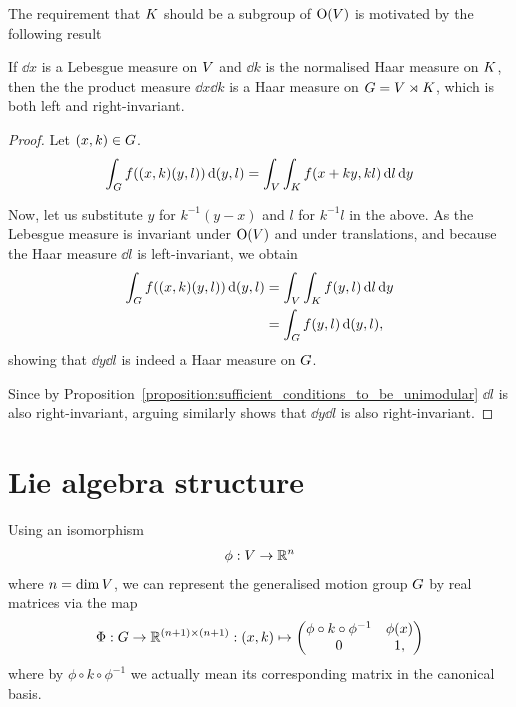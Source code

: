 The requirement that $K$ should be a subgroup of ${\mathrm{O} (V)}$ is motivated by the following result

\begin{lemma}
\label{lemma:Haar_measure}
    If $\dd x$ is a Lebesgue measure on $V$ and $\dd k$ is the normalised Haar measure on $K$,
    then the the product measure $\dd x \dd k$ is a Haar measure on $G = V \rtimes K$,
    which is both left and right-invariant.
\end{lemma}
\begin{proof}
    Let $(x, k) \in G$.
    \begin{align*}
        \int_G f((x, k) (y, l)) \,\mathrm{d} (y, l)
        = \int_V \int_K f(x + ky, k l) \,\mathrm{d} l \,\mathrm{d} y
    \end{align*}

    Now, let us substitute $y$ for $k^{-1}(y - x)$ and $l$ for $k^{-1} l$ in the above.
    As the Lebesgue measure is invariant under ${\mathrm{O} (V)}$ and under translations,
    and because the Haar measure $\dd l$ is left-invariant,
    we obtain
    \begin{align*}
        \int_G f((x, k) (y, l)) \,\mathrm{d} (y, l)
        &= \int_V \int_K f(y, l) \,\mathrm{d} l \,\mathrm{d} y\\
        &= \int_G f(y, l) \,\mathrm{d} (y, l),
    \end{align*}
    showing that $\dd y \dd l$ is indeed a Haar measure on $G$.

    Since by Proposition~\ref{proposition:sufficient_conditions_to_be_unimodular} $\dd l$ is also right-invariant,
    arguing similarly shows that $\dd y \dd l$ is also right-invariant.
\end{proof}

\section{Lie algebra structure}

Using an isomorphism
\begin{align}
    \phi : V \to \mathbb{R}^n
\end{align}
where $n = \dim V$,
we can represent the generalised motion group $G$
by real matrices via the map
\begin{align}
    \Phi : G \to \mathbb{R}^{(n + 1) \times (n + 1)} :
        (x, k) \mapsto
            \begin{pmatrix}
                \phi \circ k \circ \phi^{-1} & \phi(x)\\
                0 & 1,
            \end{pmatrix}
    \label{eq:motion_group_realised_as_matrices}
\end{align}
where by $\phi \circ k \circ \phi^{-1}$ we actually mean its corresponding matrix in the canonical basis.

